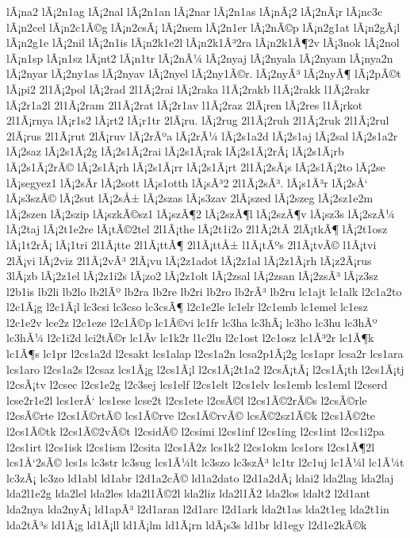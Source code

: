 {lÃ¡na2
lÃ¡2n1ag
lÃ¡2nal
lÃ¡2n1an
lÃ¡2nar
lÃ¡2n1as
lÃ¡nÃ¡2
lÃ¡2nÃ¡r
lÃ¡nc3c
lÃ¡n2cel
lÃ¡n2c1Ã©g
lÃ¡n2csÃ¡
lÃ¡2nem
lÃ¡2n1er
lÃ¡2nÃ©p
lÃ¡n2g1at
lÃ¡n2gÃ¡l
lÃ¡n2g1e
lÃ¡2nil
lÃ¡2n1is
lÃ¡n2k1e2l
lÃ¡n2k1Ã³2ra
lÃ¡n2k1Ã¶2v
lÃ¡3nok
lÃ¡2nol
lÃ¡n1sp
lÃ¡n1sz
lÃ¡nt2
lÃ¡n1tr
lÃ¡2nÃ¼
lÃ¡2nyaj
lÃ¡2nyala
lÃ¡2nyam
lÃ¡nya2n
lÃ¡2nyar
lÃ¡2ny1as
lÃ¡2nyav
lÃ¡2nyel
lÃ¡2ny1Ã©r.
lÃ¡2nyÃ³
lÃ¡2nyÃ¶
lÃ¡2pÃ©t
lÃ¡pi2
2l1Ã¡2pol
lÃ¡2rad
2l1Ã¡2rai
lÃ¡2raka
l1Ã¡2rakb
l1Ã¡2rakk
l1Ã¡2rakr
lÃ¡2r1a2l
2l1Ã¡2ram
2l1Ã¡2rat
lÃ¡2r1av
l1Ã¡2raz
2lÃ¡ren
lÃ¡2res
l1Ã¡rkot
2l1Ã¡rnya
lÃ¡r1s2
lÃ¡rt2
lÃ¡r1tr
2lÃ¡ru.
lÃ¡2rug
2l1Ã¡2ruh
2l1Ã¡2ruk
2l1Ã¡2rul
2lÃ¡rus
2l1Ã¡rut
2lÃ¡ruv
lÃ¡2rÃºa
lÃ¡2rÃ¼
lÃ¡2s1a2d
lÃ¡2s1aj
lÃ¡2sal
lÃ¡2s1a2r
lÃ¡2saz
lÃ¡2s1Ã¡2g
lÃ¡2s1Ã¡2rai
lÃ¡2s1Ã¡rak
lÃ¡2s1Ã¡2rÃ¡
lÃ¡2s1Ã¡rb
lÃ¡2s1Ã¡2rÃ©
lÃ¡2s1Ã¡rh
lÃ¡2s1Ã¡rr
lÃ¡2s1Ã¡rt
2l1Ã¡2sÃ¡s
lÃ¡2s1Ã¡2to
lÃ¡2se
lÃ¡segyez1
lÃ¡2sÃ­r
lÃ¡2sott
lÃ¡s1otth
lÃ¡sÃ³2
2l1Ã¡2sÃ³.
lÃ¡s1Ã³r
lÃ¡2sÅ‘
lÃ¡s3szÃ©
lÃ¡2sut
lÃ¡2sÅ±
lÃ¡2szas
lÃ¡s3zav
2lÃ¡szed
lÃ¡2szeg
lÃ¡2sz1e2m
lÃ¡2szen
lÃ¡2szip
lÃ¡szkÃ©sz1
lÃ¡szÃ¶2
lÃ¡2szÃ¶l
lÃ¡2szÃ¶v
lÃ¡sz3s
lÃ¡2szÃ¼
lÃ¡2taj
lÃ¡2t1e2re
lÃ¡tÃ©2tel
2l1Ã¡the
lÃ¡2t1i2o
2l1Ã¡2tÃ­
2lÃ¡tkÃ¶
lÃ¡2t1osz
lÃ¡1t2rÃ¡
lÃ¡1tri
2l1Ã¡tte
2l1Ã¡ttÃ¶
2l1Ã¡ttÅ±
l1Ã¡tÃºs
2l1Ã¡tvÃ©
l1Ã¡tvi
2lÃ¡vi
lÃ¡2viz
2l1Ã¡2vÃ³
2lÃ¡vu
lÃ¡2z1adot
lÃ¡2z1al
lÃ¡2z1Ã¡rh
lÃ¡z2Ã¡rus
3lÃ¡zb
lÃ¡2z1el
lÃ¡2z1i2s
lÃ¡zo2
lÃ¡2z1olt
lÃ¡2zsal
lÃ¡2zsan
lÃ¡2zsÃ³
lÃ¡z3sz
l2b1is
lb2li
lb2lo
lb2lÃº
lb2ra
lb2re
lb2ri
lb2ro
lb2rÃ³
lb2ru
lc1ajt
lc1alk
l2c1a2to
l2c1Ã¡g
l2c1Ã¡l
lc3csi
lc3cso
lc3csÃ¶
l2c1e2le
lc1elr
l2c1emb
lc1emel
lc1esz
l2c1e2v
lce2z
l2c1eze
l2c1Ã©p
lc1Ã©vi
lc1fr
lc3ha
lc3hÃ¡
lc3ho
lc3hu
lc3hÃº
lc3hÃ¼
l2c1i2d
lci2tÃ©r
lc1Ã­v
lc1k2r
l1c2lu
l2c1ost
l2c1osz
lc1Ã³2r
lc1Ã¶k
lc1Ã¶s
lc1pr
l2cs1a2d
l2csakt
lcs1alap
l2cs1a2n
lcsa2p1Ã¡2g
lcs1apr
lcsa2r
lcs1ara
lcs1aro
l2cs1a2s
l2csaz
lcs1Ã¡g
l2cs1Ã¡l
l2cs1Ã¡2t1a2
l2csÃ¡tÃ¡
l2cs1Ã¡th
l2cs1Ã¡tj
l2csÃ¡tv
l2csec
l2cs1e2g
l2c3sej
lcs1elf
l2cs1elt
l2cs1elv
lcs1emb
lcs1eml
l2cserd
lcse2r1e2l
lcs1erÅ‘
lcs1ese
lcse2t
l2cs1ete
l2csÃ©l
l2cs1Ã©2rÃ©s
l2csÃ©rle
l2csÃ©rte
l2cs1Ã©rtÃ©
lcs1Ã©rve
l2cs1Ã©rvÃ©
lcsÃ©2sz1Ã©k
l2cs1Ã©2te
l2cs1Ã©tk
l2cs1Ã©2vÃ©t
l2csidÃ©
l2csimi
l2cs1inf
l2cs1ing
l2cs1int
l2cs1i2pa
l2cs1irt
l2cs1isk
l2cs1ism
l2csita
l2cs1Ã­2z
lcs1k2
l2cs1okm
lcs1ors
l2cs1Ã¶2l
lcs1Å‘2sÃ©
lcs1s
lc3str
lc3sug
lcs1Ã¼lt
lc3szo
lc3szÃ³
lc1tr
l2c1uj
lc1Ã¼l
lc1Ã¼t
lc3zÃ¡
lc3zo
ld1abl
ld1abr
l2d1a2cÃ©
ld1a2dato
l2d1a2dÃ¡
ldai2
lda2lag
lda2laj
lda2l1e2g
lda2lel
lda2les
lda2l1Ã©2l
lda2liz
lda2l1Ã­2
lda2los
ldalt2
l2d1ant
lda2nya
lda2nyÃ¡
ld1apÃ³
l2d1aran
l2d1arc
l2d1ark
lda2t1as
lda2t1eg
lda2t1in
lda2tÃ³s
ld1Ã¡g
ld1Ã¡ll
ld1Ã¡lm
ld1Ã¡rn
ldÃ¡s3s
ld1br
ld1egy
l2d1e2kÃ©k
}
